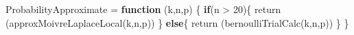 \documentclass[
]{article}
\newenvironment{Shaded}{\begin{snugshade}}{\end{snugshade}}
\newcommand{\ControlFlowTok}[1]{\textcolor[rgb]{0.13,0.29,0.53}{\textbf{#1}}}
\newcommand{\DecValTok}[1]{\textcolor[rgb]{0.00,0.00,0.81}{#1}}
\newcommand{\FunctionTok}[1]{\textcolor[rgb]{0.00,0.00,0.00}{#1}}
\newcommand{\NormalTok}[1]{#1}
\newcommand{\OtherTok}[1]{\textcolor[rgb]{0.56,0.35,0.01}{#1}}
\newcommand{\SpecialCharTok}[1]{\textcolor[rgb]{0.00,0.00,0.00}{#1}}
\begin{document}
\begin{Shaded}
\begin{Highlighting}[]
\NormalTok{ProbabilityApproximate }\OtherTok{=} \ControlFlowTok{function}\NormalTok{ (k,n,p)}
\NormalTok{\{}
  \ControlFlowTok{if}\NormalTok{(n }\SpecialCharTok{\textgreater{}} \DecValTok{20}\NormalTok{)\{}
    \FunctionTok{return}\NormalTok{ (}\FunctionTok{approxMoivreLaplaceLocal}\NormalTok{(k,n,p))}
\NormalTok{  \}}
  \ControlFlowTok{else}\NormalTok{\{}
    \FunctionTok{return}\NormalTok{ (}\FunctionTok{bernoulliTrialCalc}\NormalTok{(k,n,p))}
\NormalTok{  \}}
\NormalTok{\}}
\end{Highlighting}
\end{Shaded}
\end{document}
